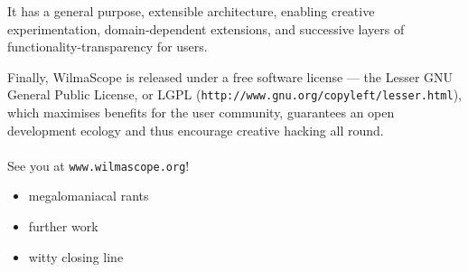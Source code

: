 \documentclass[runningheads]{cl2emult}
\newcommand{\url}[1]{{\small{\tt #1}}}
\begin{document}
It has a general purpose, extensible architecture, enabling creative
experimentation, domain-dependent extensions, and successive layers of
functionality-transparency for users.

Finally, WilmaScope is released under a free software license --- the Lesser
GNU General Public License, or LGPL
(\url{http://www.gnu.org/copyleft/lesser.html}), which maximises benefits for
the user community, guarantees an open development ecology and thus encourage
creative hacking all round.

\paragraph{}

See you at \url{www.wilmascope.org}!

\begin{itemize}
\item megalomaniacal rants
\item further work
\item witty closing line
\end{itemize}

%
%
%
%
%
%
%


\newpage
{}


%
\end{document}
